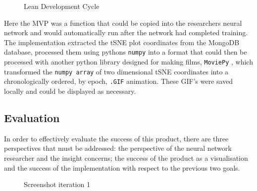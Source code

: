 \documentclass[a4paper,11pt,titlepage]{article}
\begin{document}
	\begin{figure}[H]
    			\caption{Lean Development Cycle}%
	\end{figure}	
	
	Here the MVP was a function that could be copied into the researchers neural network and would automatically run after the network had completed training. The implementation extracted the tSNE plot coordinates from the MongoDB database, processed them using pythons \texttt{numpy} into a format that could then be processed with another python library designed for making films, \texttt{MoviePy} \cite{}, which transformed the \texttt{numpy array} of two dimensional tSNE coordinates into a chronologically ordered, by epoch, \texttt{.GIF} animation. These GIF's were saved locally and could be displayed as necessary.
	
	\subsection{Evaluation}
	In order to effectively evaluate the success of this product, there are three perspectives that must be addressed: the perspective of the neural network researcher and the insight concerns; the success of the product as a visualisation and the success of the implementation with respect to the previous two goals.
	
	\begin{figure}[H]
    			\caption{Screenshot iteration 1}%
	\end{figure}		
	
\end{document}
